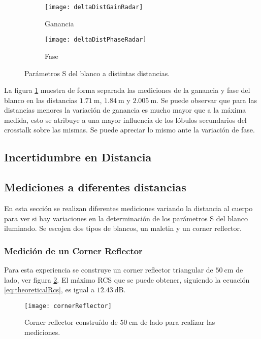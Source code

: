 \begin{figure}[H]
  \centering
  \begin{subfigure}{0.49\textwidth}
    \texttt{[image: deltaDistGainRadar]}
    \caption{Ganancia}
  \end{subfigure}
  \begin{subfigure}{0.49\textwidth}
    \texttt{[image: deltaDistPhaseRadar]}
    \caption{Fase}
  \end{subfigure}
  \caption{Parámetros S del blanco a distintas distancias.}
  \label{fig:deltaDistRadar}
\end{figure}
La figura \ref{fig:deltaDistRadar} muestra de forma separada las mediciones de la ganancia y fase del blanco en las distancias $\SI{1.71}{\meter}$, $\SI{1.84}{\meter}$ y $\SI{2.005}{\meter}$. Se puede observar que para las distancias menores la variación de ganancia es mucho mayor que a la máxima medida, esto se atribuye a una mayor influencia de los lóbulos secundarios del crosstalk sobre las mismas. Se puede apreciar lo mismo ante la variación de fase.


\subsection{Incertidumbre en Distancia}

\subsection{Mediciones a diferentes distancias}

En esta sección se realizan diferentes mediciones variando la distancia al cuerpo para ver si hay variaciones en la determinación de los parámetros S del blanco iluminado. Se escojen dos tipos de blancos, un maletin y un corner reflector.


\subsubsection{Medición de un Corner Reflector}

Para esta experiencia se construye un corner reflector triangular de $\SI{50}{\centi\meter}$ de lado, ver figura \ref{fig:corner}. El máximo RCS que se puede obtener, siguiendo la ecuación \ref{eq:theoreticalRcs}, es igual a $\SI{12.43}{\dB}$. %
\begin{figure}[htb]
  \centering
  \texttt{[image: cornerReflector]}
  \caption{Corner reflector construído de $\SI{50}{\centi\meter}$ de lado para realizar las mediciones.}
  \label{fig:corner}
\end{figure}


